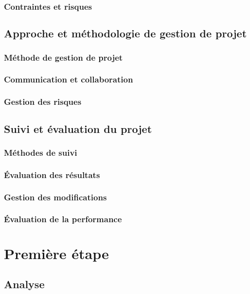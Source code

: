 \documentclass[a4paper, 12pt]{report}
\begin{document}
        \subsection{Contraintes et risques}

\clearpage
    \section{Approche et méthodologie de gestion de projet}
        \subsection{Méthode de gestion de projet}
        \subsection{Communication et collaboration}
        \subsection{Gestion des risques}

\clearpage
    \section{Suivi et évaluation du projet}
        \subsection{Méthodes de suivi}
        \subsection{Évaluation des résultats}
        \subsection{Gestion des modifications}
        \subsection{Évaluation de la performance}
    

\chapter{Première étape}
\minitoc
{}
\clearpage
    \section{Analyse}
\end{document}
